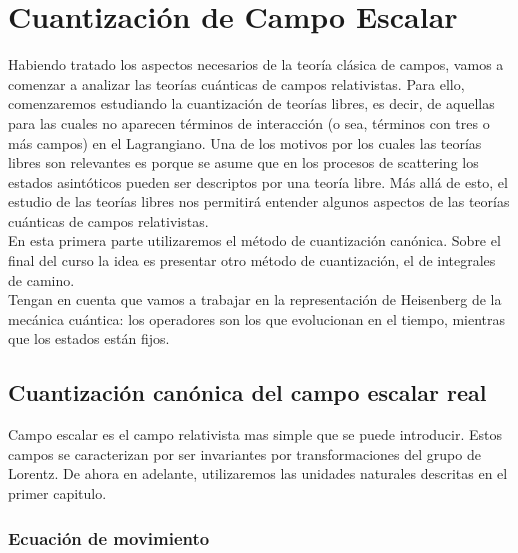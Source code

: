 
\chapter{Cuantización de Campo Escalar}

\newcommand{\ON}{N}
\newcommand{\OH}{H}

\label{capitulo_3}

Habiendo tratado los aspectos necesarios de la teoría clásica de campos, vamos a comenzar a analizar las teorías cuánticas de campos relativistas. Para ello, comenzaremos estudiando la cuantización de teorías libres, es decir, de aquellas para las cuales no aparecen términos de interacción (o sea, términos con tres o más campos) en el Lagrangiano. Una de los motivos por los cuales las teorías libres son relevantes es porque se asume que en los procesos de scattering los estados asintóticos pueden ser descriptos por una teoría libre. Más allá de esto, el estudio de las teorías libres nos permitirá entender algunos aspectos de las teorías cuánticas de campos relativistas.\\

En esta primera parte utilizaremos el método de cuantización canónica. Sobre el final del curso
la idea es presentar otro método de cuantización, el de integrales de camino.\\

Tengan en cuenta que vamos a trabajar en la representación de Heisenberg de la mecánica cuántica: los operadores son los que evolucionan en el tiempo, mientras que los estados están
fijos.

\section{Cuantización canónica del campo escalar real}

Campo escalar es el campo relativista mas simple que se puede introducir. Estos campos se caracterizan por ser invariantes por transformaciones del grupo de Lorentz. De ahora en adelante, utilizaremos las unidades naturales descritas en el primer capitulo.

\subsection{Ecuación de movimiento}

